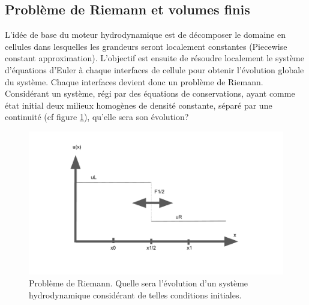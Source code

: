 \subsection{Problème de Riemann et volumes finis}

L'idée de base du moteur hydrodynamique est de décomposer le domaine en cellules dans lesquelles les grandeurs seront localement constantes (Piecewise constant approximation).
L'objectif est ensuite de résoudre localement le système d'équations d'Euler à chaque interfaces de cellule pour obtenir l'évolution globale du système.
Chaque interfaces devient donc un problème de Riemann.
Considérant un système, régi par des équations de conservations, ayant comme état initial deux milieux homogènes de densité constante, séparé par une continuité (cf figure \ref{fig:riemann}), qu'elle sera son évolution?


\begin{figure}
        \includegraphics[width=.95\linewidth]{img/02/riemann.pdf} 
        \caption[Problème de Riemann]{Problème de Riemann. Quelle sera l'évolution d'un système hydrodynamique considérant de telles conditions initiales.  
 		\label{fig:riemann}
 		}
\end{figure}

